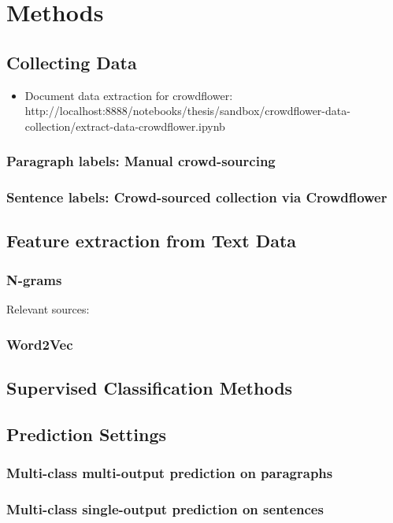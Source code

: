 \clearpage
\section{Methods}

\subsection{Collecting Data}

\begin{itemize}

\item Document data extraction for crowdflower: http://localhost:8888/notebooks/thesis/sandbox/crowdflower-data-collection/extract-data-crowdflower.ipynb

\end{itemize}

\subsubsection{Paragraph labels: Manual crowd-sourcing}

\subsubsection{Sentence labels: Crowd-sourced collection via Crowdflower}

\subsection{Feature extraction from Text Data}

\subsubsection{N-grams}

Relevant sources: \cite{Chen:1996aa}

\subsubsection{Word2Vec}

\subsection{Supervised Classification Methods}

\subsection{Prediction Settings}

\subsubsection{Multi-class multi-output prediction on paragraphs}

\subsubsection{Multi-class single-output prediction on sentences}

